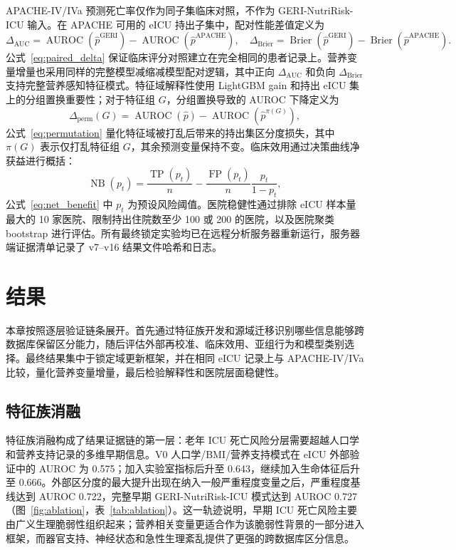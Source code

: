 \documentclass[11pt]{ctexart}
\begin{document}
APACHE-IV/IVa 预测死亡率仅作为同子集临床对照，不作为 GERI-NutriRisk-ICU 输入。在 APACHE 可用的 eICU 持出子集中，配对性能差值定义为
\begin{equation}
\Delta_{\mathrm{AUC}}=\operatorname{AUROC}(\hat{p}^{\mathrm{GERI}})-\operatorname{AUROC}(\hat{p}^{\mathrm{APACHE}}),\quad
\Delta_{\mathrm{Brier}}=\operatorname{Brier}(\hat{p}^{\mathrm{GERI}})-\operatorname{Brier}(\hat{p}^{\mathrm{APACHE}}).
\label{eq:paired_delta}
\end{equation}
公式~\ref{eq:paired_delta} 保证临床评分对照建立在完全相同的患者记录上。营养变量增量也采用同样的完整模型减缩减模型配对逻辑，其中正向 $\Delta_{\mathrm{AUC}}$ 和负向 $\Delta_{\mathrm{Brier}}$ 支持完整营养感知特征模式。特征域解释性使用 LightGBM gain 和持出 eICU 集上的分组置换重要性；对于特征组 $G$，分组置换导致的 AUROC 下降定义为
\begin{equation}
\Delta_{\mathrm{perm}}(G)=\operatorname{AUROC}(\hat{p})-\operatorname{AUROC}(\hat{p}^{\pi(G)}),
\label{eq:permutation}
\end{equation}
公式~\ref{eq:permutation} 量化特征域被打乱后带来的持出集区分度损失，其中 $\pi(G)$ 表示仅打乱特征组 $G$，其余预测变量保持不变。临床效用通过决策曲线净获益进行概括：
\begin{equation}
\operatorname{NB}(p_t)=\frac{\operatorname{TP}(p_t)}{n}-\frac{\operatorname{FP}(p_t)}{n}\frac{p_t}{1-p_t},
\label{eq:net_benefit}
\end{equation}
公式~\ref{eq:net_benefit} 中 $p_t$ 为预设风险阈值。医院稳健性通过排除 eICU 样本量最大的 10 家医院、限制持出住院数至少 100 或 200 的医院，以及医院聚类 bootstrap 进行评估。所有最终锁定实验均已在远程分析服务器重新运行，服务器端证据清单记录了 v7--v16 结果文件哈希和日志。

\section{结果}

本章按照逐层验证链条展开。首先通过特征族开发和源域迁移识别哪些信息能够跨数据库保留区分能力，随后评估外部再校准、临床效用、亚组行为和模型类别选择。最终结果集中于锁定域更新框架，并在相同 eICU 记录上与 APACHE-IV/IVa 比较，量化营养变量增量，最后检验解释性和医院层面稳健性。

\subsection{特征族消融}
特征族消融构成了结果证据链的第一层：老年 ICU 死亡风险分层需要超越人口学和营养支持记录的多维早期信息。V0 人口学/BMI/营养支持模式在 eICU 外部验证中的 AUROC 为 0.575；加入实验室指标后升至 0.643，继续加入生命体征后升至 0.666。外部区分度的最大提升出现在纳入一般严重程度变量之后，严重程度基线达到 AUROC 0.722，完整早期 GERI-NutriRisk-ICU 模式达到 AUROC 0.727（图~\ref{fig:ablation}，表~\ref{tab:ablation}）。这一轨迹说明，早期 ICU 死亡风险主要由广义生理脆弱性组织起来；营养相关变量更适合作为该脆弱性背景的一部分进入框架，而器官支持、神经状态和急性生理紊乱提供了更强的跨数据库区分信息。
\end{document}
